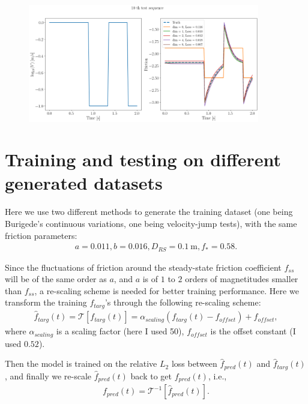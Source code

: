 \begin{figure}[H]
    \centering
    \includegraphics[width=0.9\textwidth]{images/FGJump2_fixed.png}
    \label{fig:FGJump2Fixed}
\end{figure}

\section{Training and testing on different generated datasets}
Here we use two different methods to generate the training dataset (one being Burigede's continuous variations, one being velocity-jump tests), 
with the same friction parameters:
\begin{align*}
    a = 0.011, b = 0.016, D_{RS} = 0.1\ \mathrm{m}, f_* = 0.58.
\end{align*}

Since the fluctuations of friction around the steady-state friction coefficient $f_{ss} $will be of the same order as $a$, 
and $a$ is of $1$ to $2$ orders of magnetitudes smaller than $f_{ss}$, 
a re-scaling scheme is needed for better training performance. 
Here we transform the training $f_{targ}$'s through the following re-scaling scheme:
\begin{align}
    \hat{f}_{targ}(t) = \mathcal{T}\left[{f}_{targ}(t)\right] = \alpha_{scaling}  \left({f}_{targ}(t) - f_{offset}\right) + f_{offset}, \label{eq:rescalingScheme}
\end{align}
where $\alpha_{scaling}$ is a scaling factor (here I used 50), 
$f_{offset}$ is the offset constant (I used $0.52$). 

Then the model is trained on the relative $L_2$ loss between $\hat{f}_{pred}(t)$ and $\hat{f}_{targ}(t)$, 
and finally we re-scale $\hat{f}_{pred}(t)$ back to get $f_{pred}(t)$, i.e., 
\begin{align*}
    {f}_{pred}(t) = \mathcal{T}^{-1}\left[\hat{f}_{pred}(t)\right]. 
\end{align*}

